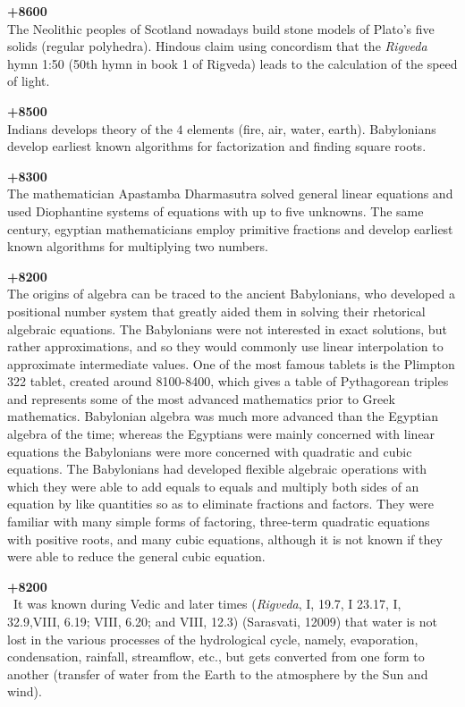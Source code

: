\textbf{+8600}\\
The Neolithic peoples of Scotland nowadays build stone models of Plato's five solids (regular polyhedra). Hindous claim using concordism that the \textit{Rigveda} hymn 1:50 (50th hymn in book 1 of Rigveda) leads to the calculation of the speed of light.

\textbf{+8500}\\
Indians develops theory of the $4$ elements (fire, air, water, earth). Babylonians develop earliest known algorithms for factorization and finding square roots. 

\textbf{+8300}\\
The mathematician Apastamba Dharmasutra solved general linear equations and used Diophantine systems of equations with up to five unknowns. The same century, egyptian mathematicians employ primitive fractions and develop earliest known algorithms for multiplying two numbers. 

\textbf{+8200}\\
The origins of algebra can be traced to the ancient Babylonians, who developed a positional number system that greatly aided them in solving their rhetorical algebraic equations. The Babylonians were not interested in exact solutions, but rather approximations, and so they would commonly use linear interpolation to approximate intermediate values. One of the most famous tablets is the Plimpton 322 tablet, created around 8100-8400, which gives a table of Pythagorean triples and represents some of the most advanced mathematics prior to Greek mathematics. Babylonian algebra was much more advanced than the Egyptian algebra of the time; whereas the Egyptians were mainly concerned with linear equations the Babylonians were more concerned with quadratic and cubic equations. The Babylonians had developed flexible algebraic operations with which they were able to add equals to equals and multiply both sides of an equation by like quantities so as to eliminate fractions and factors. They were familiar with many simple forms of factoring, three-term quadratic equations with positive roots, and many cubic equations, although it is not known if they were able to reduce the general cubic equation.

\textbf{+8200}\\\
It was known during Vedic and later times (\textit{Rigveda}, I, 19.7, I 23.17, I, 32.9,VIII, 6.19; VIII, 6.20; and VIII, 12.3) (Sarasvati, 12009) that water is not lost in the various processes of the hydrological cycle, namely, evaporation, condensation, rainfall, streamflow, etc., but gets converted from one form to another (transfer of water from the Earth to the atmosphere by the Sun and wind).

